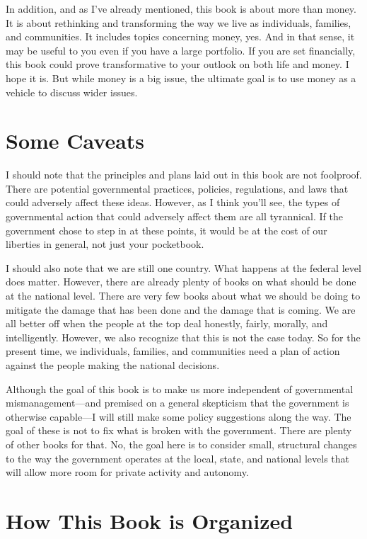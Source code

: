 In addition, and
as I’ve already
mentioned, this book is about more than money. It is about rethinking
and transforming the way we live as individuals, families, and
communities. It includes topics concerning money, yes. And in that
sense, it may be useful to you even if you have a large portfolio. If
you are set financially, this book could prove transformative to your
outlook on both life and money.
I hope it is. But
while money is a big issue, the ultimate goal is to use money as a
vehicle to discuss wider issues. 

\section{Some Caveats}

I should note that the principles and plans laid out in this book are
not foolproof. There are potential governmental practices, policies,
regulations, and laws that could adversely affect these ideas. However,
as I think you’ll see, the types of governmental action that could
adversely affect them are all tyrannical. If the government chose to
step in at these points, it would be at the cost of our liberties in
general, not just your pocketbook. 

I should also note that we are still one country. What happens at the
federal level does matter. However, there are already plenty of books
on what should be done at the national level. There are very few books
about what we should be doing to mitigate the damage that has been done
and the damage that is coming. We are all better off when the people at
the top deal honestly, fairly, morally, and intelligently. However, we
also recognize that this is not the case today. So for the present
time, we individuals, families, and communities need a plan of action
against the people making the national decisions.

Although the goal of this book is to make us more independent of
governmental
mismanagement—and
premised on a general skepticism that the government is otherwise
capable—I will still make some policy suggestions along the way. The
goal of these is not to fix what is broken with the government. There
are plenty of other books for that. No, the goal here is to  consider
small, structural changes to the way the government operates at the
local, state, and national levels
that will allow more
room for private activity and autonomy.

\section{How This Book is Organized}

